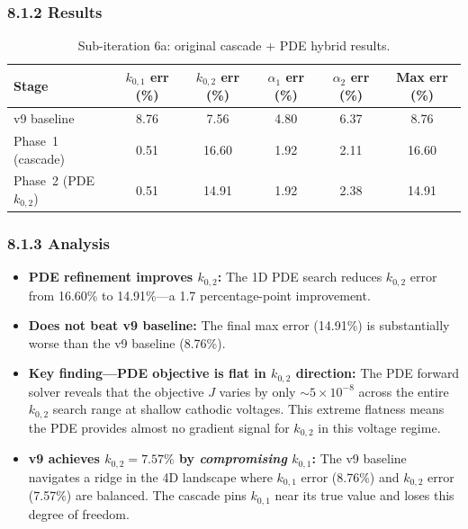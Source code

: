 \documentclass[11pt]{article}
\begin{document}
\subsubsection*{8.1.2 Results}

\begin{table}[H]
  \centering
  \caption{Sub-iteration 6a: original cascade + PDE hybrid results.}
  \label{tab:s6a}
  \begin{tabular}{l S[round-precision=2] S[round-precision=2]
                    S[round-precision=2] S[round-precision=2]
                    S[round-precision=2]}
    \toprule
    Stage & {$k_{0,1}$ err (\%)} & {$k_{0,2}$ err (\%)}
          & {$\alpha_1$ err (\%)} & {$\alpha_2$ err (\%)}
          & {Max err (\%)} \\
    \midrule
    v9 baseline             &  8.76 &  7.56 & 4.80 & 6.37 &  8.76 \\
    Phase~1 (cascade)       &  0.51 & 16.60 & 1.92 & 2.11 & 16.60 \\
    Phase~2 (PDE $k_{0,2}$) &  0.51 & 14.91 & 1.92 & 2.38 & 14.91 \\
    \bottomrule
  \end{tabular}
\end{table}

\subsubsection*{8.1.3 Analysis}

\begin{itemize}
  \item \textbf{PDE refinement improves $k_{0,2}$:} The 1D PDE search reduces
        $k_{0,2}$ error from 16.60\% to 14.91\%---a 1.7 percentage-point
        improvement.

  \item \textbf{Does not beat v9 baseline:} The final max error (14.91\%) is
        substantially worse than the v9 baseline (8.76\%).

  \item \textbf{Key finding---PDE objective is flat in $k_{0,2}$ direction:}
        The PDE forward solver reveals that the objective $J$
        varies by only ${\sim}5 \times 10^{-8}$ across the entire $k_{0,2}$
        search range at shallow cathodic voltages.  This extreme flatness
        means the PDE provides almost no gradient signal for $k_{0,2}$ in
        this voltage regime.

  \item \textbf{v9 achieves $k_{0,2} = 7.57\%$ by \emph{compromising}
        $k_{0,1}$:} The v9 baseline navigates a ridge in the 4D landscape
        where $k_{0,1}$ error (8.76\%) and $k_{0,2}$ error (7.57\%) are
        balanced.  The cascade pins $k_{0,1}$ near its true value and loses
        this degree of freedom.
\end{itemize}
\end{document}
